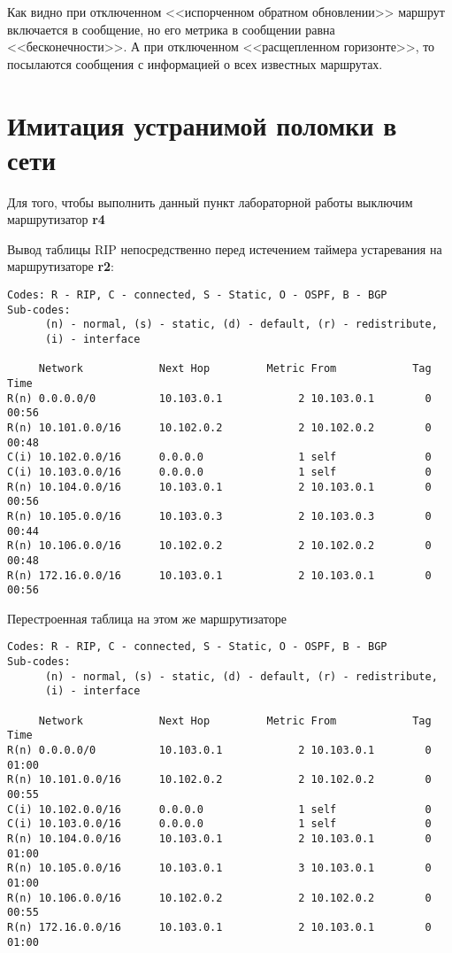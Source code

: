 \documentclass[a4paper,12pt]{article}
\begin{document}
Как видно при отключенном <<испорченном обратном обновлении>> маршрут
включается в сообщение, но его метрика в сообщении равна <<бесконечности>>.
А при отключенном <<расщепленном горизонте>>, то посылаются сообщения с
информацией о всех известных маршрутах.

\section{Имитация устранимой поломки в сети}

Для того, чтобы выполнить данный пункт лабораторной работы выключим
маршрутизатор \textbf{r4}

Вывод таблицы RIP непосредственно перед истечением таймера устаревания на маршрутизаторе \textbf{r2}:
\begin{Verbatim}
Codes: R - RIP, C - connected, S - Static, O - OSPF, B - BGP
Sub-codes:
      (n) - normal, (s) - static, (d) - default, (r) - redistribute,
      (i) - interface

     Network            Next Hop         Metric From            Tag Time
R(n) 0.0.0.0/0          10.103.0.1            2 10.103.0.1        0 00:56
R(n) 10.101.0.0/16      10.102.0.2            2 10.102.0.2        0 00:48
C(i) 10.102.0.0/16      0.0.0.0               1 self              0
C(i) 10.103.0.0/16      0.0.0.0               1 self              0
R(n) 10.104.0.0/16      10.103.0.1            2 10.103.0.1        0 00:56
R(n) 10.105.0.0/16      10.103.0.3            2 10.103.0.3        0 00:44
R(n) 10.106.0.0/16      10.102.0.2            2 10.102.0.2        0 00:48
R(n) 172.16.0.0/16      10.103.0.1            2 10.103.0.1        0 00:56
\end{Verbatim}

Перестроенная таблица на этом же маршрутизаторе
\begin{Verbatim}
Codes: R - RIP, C - connected, S - Static, O - OSPF, B - BGP
Sub-codes:
      (n) - normal, (s) - static, (d) - default, (r) - redistribute,
      (i) - interface

     Network            Next Hop         Metric From            Tag Time
R(n) 0.0.0.0/0          10.103.0.1            2 10.103.0.1        0 01:00
R(n) 10.101.0.0/16      10.102.0.2            2 10.102.0.2        0 00:55
C(i) 10.102.0.0/16      0.0.0.0               1 self              0
C(i) 10.103.0.0/16      0.0.0.0               1 self              0
R(n) 10.104.0.0/16      10.103.0.1            2 10.103.0.1        0 01:00
R(n) 10.105.0.0/16      10.103.0.1            3 10.103.0.1        0 01:00
R(n) 10.106.0.0/16      10.102.0.2            2 10.102.0.2        0 00:55
R(n) 172.16.0.0/16      10.103.0.1            2 10.103.0.1        0 01:00
\end{Verbatim}
\end{document}
